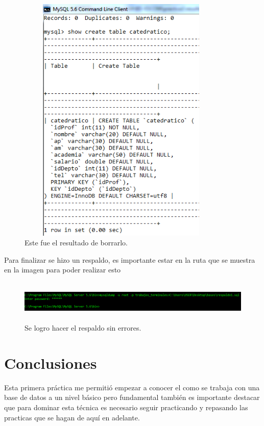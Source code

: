 \documentclass[12pt, titlepage]{article}
\begin{document}
\begin{figure}[H]
    \begin{center}
        \includegraphics[width=10cm, height=12cm]{img/constraint2.png}
        \caption{Este fue el resultado de borrarlo.}
        \label{fig:constraint2}
    \end{center}
\end{figure}
    Para finalizar se hizo un respaldo, es importante estar en la ruta que se muestra en la imagen para poder realizar esto
    \begin{figure}[H]
        \begin{center}
            \includegraphics[width=16cm, height=2cm]{img/respaldo.png}
            \caption{Se logro hacer el respaldo sin errores.}
            \label{fig:respaldo}
        \end{center}
    \end{figure}
    \section{Conclusiones}
    Esta primera práctica me permitió empezar a conocer el como se trabaja con una base de datos a un nivel básico pero fundamental también es importante destacar que para dominar esta técnica es necesario seguir practicando y repasando las practicas que se hagan de aquí en adelante.
     
    
\end{document}
